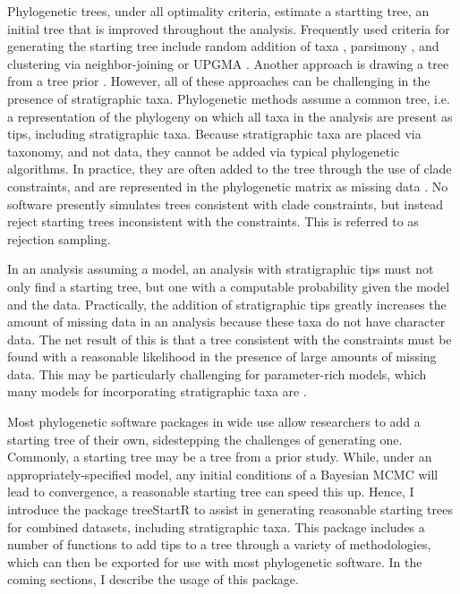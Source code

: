 Phylogenetic trees, under all optimality criteria, estimate a startting tree, an initial tree that is improved throughout the analysis.
Frequently used criteria for generating the starting tree include random addition of taxa \citep[]{raxml8, beast2}, parsimony \citep{raxml8}, and clustering via neighbor-joining or UPGMA \citep{beast2}.
Another approach is drawing a tree from a tree prior \citep{Hoehna2014b, Hoehna2017a}.
However, all of these approaches can be challenging in the presence of stratigraphic taxa. 
Phylogenetic methods assume a common tree, i.e. a representation of the phylogeny on which all taxa in the analysis are present as tips, including stratigraphic taxa.
Because stratigraphic taxa are placed via taxonomy, and not data, they cannot be added via typical phylogenetic algorithms.
In practice, they are often added to the tree through the use of clade constraints, and are represented in the phylogenetic matrix as missing data \citep{Hoehna2014b, Hoehna2017a}.
No software presently simulates trees consistent with clade constraints, but instead reject starting trees inconsistent with the constraints.
This is referred to as rejection sampling.

In an analysis assuming a model, an analysis with stratigraphic tips must not only find a starting tree, but one with a computable probability given the model and the data.
Practically, the addition of stratigraphic tips greatly increases the amount of missing data in an analysis because these taxa do not have character data.
The net result of this is that a tree consistent with the constraints must be found with a reasonable likelihood in the presence of large amounts of missing data.
This may be particularly challenging for parameter-rich models, which many models for incorporating stratigraphic taxa are \citep{Heath2014}.

Most phylogenetic software packages in wide use allow researchers to add a starting tree of their own, sidestepping the challenges of generating one. 
Commonly, a starting tree may be a tree from a prior study. 
While, under an appropriately-specified model, any initial conditions of a Bayesian MCMC will lead to convergence, a reasonable starting tree can speed this up.
Hence, I introduce the package treeStartR to assist in generating reasonable starting trees for combined datasets, including stratigraphic taxa.
This package includes a number of functions to add tips to a tree through a variety of methodologies, which can then be exported for use with most phylogenetic software.
In the coming sections, I describe the usage of this package.

